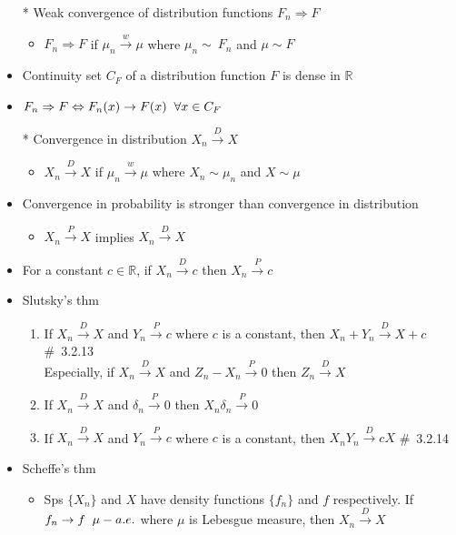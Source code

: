 \documentclass[12pt, A4]{article}
\begin{document}
\begin{itemize}
\begin{itemize}
	\end{itemize}
	\item[*] Weak convergence of distribution functions $F_n\Rightarrow F$
	\begin{itemize}
		\item $F_n\Rightarrow F$ if $\mu_n\xrightarrow{w} \mu$ where $\mu_n\sim\ F_n$ and $\mu\sim F$
	\end{itemize}
	\item Continuity set $C_F$ of a distribution function $F$ is dense in $\mathbb{R}$
	\item $F_n\Rightarrow F \Leftrightarrow F_n(x)\rightarrow F(x) \hspace{0.2cm}\forall x\in C_F$
	\item[*] Convergence in distribution $X_n\xrightarrow{D} X$
	\begin{itemize}
		\item $X_n\xrightarrow{D} X$ if $\mu_n\xrightarrow{w}\mu$ where $X_n\sim \mu_n$ and $X\sim \mu$
	\end{itemize}
	\item Convergence in probability is stronger than convergence in distribution
	\begin{itemize}
		\item $X_n\xrightarrow{P}X$ implies $X_n\xrightarrow{D} X$
	\end{itemize}
	\item For a constant $c\in \mathbb{R}$,\hspace{0.1cm} if $X_n\xrightarrow{D} c$ then $X_n\xrightarrow{P} c$
	\item Slutsky's thm
	\begin{enumerate}
		\item If $X_n\xrightarrow{D} X$ and $Y_n\xrightarrow{P} c$ where $c$ is a constant, then $X_n+Y_n\xrightarrow{D}X+c$ \quad \#\ 3.2.13
		\\Especially, if $X_n\xrightarrow{D}X$ and  $Z_n-X_n\xrightarrow{P}0$ then $Z_n\xrightarrow{D}X$
		\item If $X_n\xrightarrow{D} X$ and $\delta_n\xrightarrow{P} 0$ then $X_n\delta_n\xrightarrow{P} 0$
		\item If $X_n\xrightarrow{D} X$ and $Y_n\xrightarrow{P} c$ where $c$ is a constant, then $X_nY_n\xrightarrow{D} cX$ \quad \#\ 3.2.14
	\end{enumerate}
\clearpage
	\item Scheffe's thm
	\begin{itemize}
		\item Sps $\{X_n\}$ and $X$ have density functions $\{f_n\}$ and $f$ respectively. If $f_n\rightarrow f \hspace{0.2cm} \mu-a.e.$ where $\mu$ is Lebesgue measure, then $X_n\xrightarrow{D} X$

\end{itemize}
\end{itemize}
\end{document}
